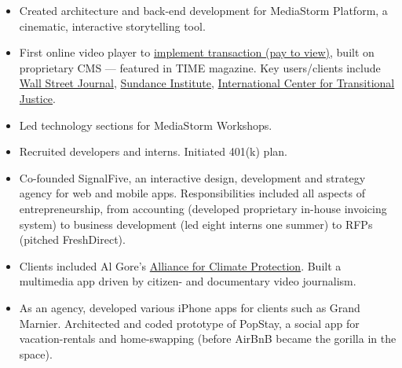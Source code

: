 \documentclass[a4paper,10pt]{memoir} %
\begin{document}
\begin{itemize}
	\item Created architecture and back-end development for MediaStorm Platform, a cinematic, interactive storytelling tool. 
	\item First online video player to \href{http://time.com/46716/game-changer-mediastorm-launches-pay-per-story-video-player/}{implement transaction (pay to view)}, built on proprietary CMS --- featured in TIME magazine. Key users/clients include \href{https://mediastorm.com/clients/2018-icp-infinity-awards}{Wall Street Journal}, \href{https://mediastorm.com/clients/sundance-short-film-challenge}{Sundance Institute}, \href{https://mediastorm.com/clients/i-am-not-who-they-think-i-am-for-ictj}{International Center for Transitional Justice}. 
	\item Led technology sections for MediaStorm Workshops.
	\item Recruited developers and interns. Initiated 401(k) plan.
\end{itemize}
\Sep %

\clearpage %
\userinformation %
\framebreak %


\begin{itemize}
	\item Co-founded SignalFive, an interactive design, development and strategy agency for web and mobile apps. Responsibilities included all aspects of entrepreneurship, from accounting (developed proprietary in-house invoicing system) to business development (led eight interns one summer) to RFPs (pitched FreshDirect).

	\item Clients included Al Gore's \href{https://www.climaterealityproject.org/}{Alliance for Climate Protection}. Built a multimedia app driven by citizen- and documentary video journalism.

	\item As an agency, developed various iPhone apps for clients such as Grand Marnier. Architected and coded prototype of PopStay, a social app for vacation-rentals and home-swapping (before AirBnB became the gorilla in the space).
\end{itemize}
\Sep %
\end{document}
